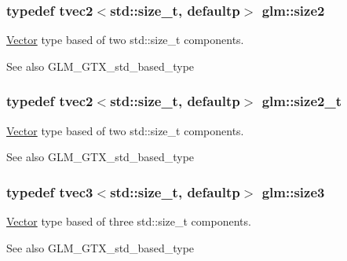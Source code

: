 \subsubsection[{size2}]{\setlength{\rightskip}{0pt plus 5cm}typedef tvec2$<$std\+::size\+\_\+t, defaultp$>$ {\bf glm\+::size2}}\label{group__gtx__std__based__type_gab8b434ee2ba109726915e977c6aca22a}
\hyperlink{class_vector}{Vector} type based of two std\+::size\+\_\+t components. \begin{DoxySeeAlso}{See also}
G\+L\+M\+\_\+\+G\+T\+X\+\_\+std\+\_\+based\+\_\+type 
\end{DoxySeeAlso}
\hypertarget{group__gtx__std__based__type_ga47b1e2bca519b02eb8500a240216b5de}{}
\subsubsection[{size2\+\_\+t}]{\setlength{\rightskip}{0pt plus 5cm}typedef tvec2$<$std\+::size\+\_\+t, defaultp$>$ {\bf glm\+::size2\+\_\+t}}\label{group__gtx__std__based__type_ga47b1e2bca519b02eb8500a240216b5de}
\hyperlink{class_vector}{Vector} type based of two std\+::size\+\_\+t components. \begin{DoxySeeAlso}{See also}
G\+L\+M\+\_\+\+G\+T\+X\+\_\+std\+\_\+based\+\_\+type 
\end{DoxySeeAlso}
\hypertarget{group__gtx__std__based__type_gacf3e47fc09ad812f100e13442919fc79}{}
\subsubsection[{size3}]{\setlength{\rightskip}{0pt plus 5cm}typedef tvec3$<$std\+::size\+\_\+t, defaultp$>$ {\bf glm\+::size3}}\label{group__gtx__std__based__type_gacf3e47fc09ad812f100e13442919fc79}
\hyperlink{class_vector}{Vector} type based of three std\+::size\+\_\+t components. \begin{DoxySeeAlso}{See also}
G\+L\+M\+\_\+\+G\+T\+X\+\_\+std\+\_\+based\+\_\+type 
\end{DoxySeeAlso}
\hypertarget{group__gtx__std__based__type_ga689991bc66c16637f043ade5cbb87260}{}
